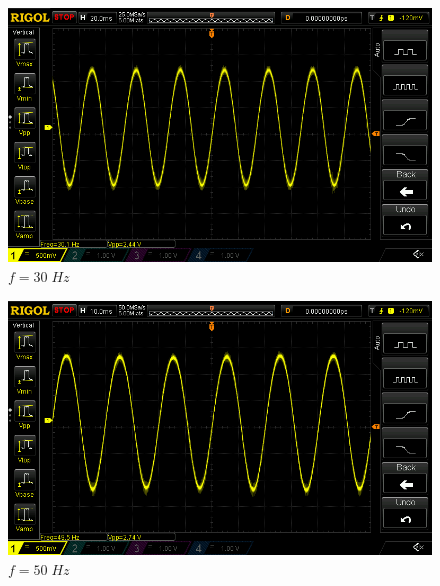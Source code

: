 \documentclass[uplatex,a4paper,11pt,oneside,openany]{jsbook}
\begin{document}
\begin{spacing}{0.67}
  \begin{multicols}{2}
    \begin{figure}[H]
       \centering
        \includegraphics[keepaspectratio, scale=0.28, angle=0]
                    {rigol/figs/FrqCharM1Y1_2kR/30hz.png}
                    \caption{$f=30\;Hz$}
                    \label{fig:frq30}
    \end{figure}
  
    \begin{figure}[H]
       \centering
        \includegraphics[keepaspectratio, scale=0.28, angle=0]
                  {rigol/figs/FrqCharM1Y1_2kR/50hz.png}
                  \caption{$f=50\;Hz$}
                  \label{fig:frq50}
    \end{figure}
  \end{multicols}


\end{spacing}
\end{document}
